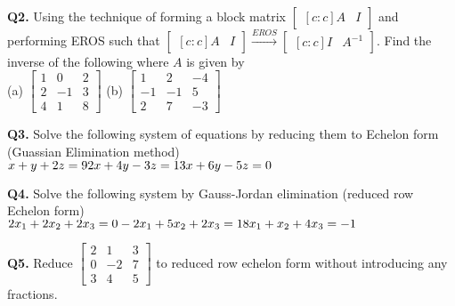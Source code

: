\documentclass[addpoints]{exam}
\begin{document}
\begin{sloppypar}
\begin{questions}
\begin{solution}
    \end{solution}

    \question
    \textbf{Q2. } Using the technique of forming a block matrix $\begin{bmatrix}[c:c]
        A & I
    \end{bmatrix}$ and performing EROS such that $ \begin{bmatrix}[c:c]
        A & I
    \end{bmatrix} \xrightarrow{EROS} \begin{bmatrix}[c:c]
        I & A^{-1}
    \end{bmatrix}$. Find the inverse of the following where $A$ is given by \\ (a) $ \begin{bmatrix}
        1 & 0 & 2 \\ 2 & -1 & 3 \\ 4 & 1 & 8
    \end{bmatrix} $ (b) $ \begin{bmatrix}
        1 & 2 & -4 \\ -1 & -1 & 5 \\ 2 & 7 & -3
    \end{bmatrix} $
    \begin{solution}
        
    \end{solution}

    \question
    \textbf{Q3. } Solve the following system of equations by reducing them to Echelon form (Guassian Elimination method) \\ 
    $ x + y + 2z = 9 \\ 2x + 4y - 3z = 1 \\ 3x + 6y -5z = 0 $
    \begin{solution}
        
    \end{solution}

    \question
    \textbf{Q4. } Solve the following system by Gauss-Jordan elimination (reduced row Echelon form) \\ 
    $ 2x_1 + 2x_2 + 2x_3 = 0 \\ -2x_1 + 5x_2 + 2x_3 = 1 \\ 8x_1 + x_2 + 4x_3 = -1 $
    \begin{solution}
        
    \end{solution}

    \question
    \textbf{Q5. } Reduce $ \begin{bmatrix}
        2 & 1 & 3 \\ 0 & -2 & 7 \\ 3 & 4 & 5
    \end{bmatrix} $ to reduced row echelon form without introducing any fractions.
    \begin{solution}
        

\end{solution}
\end{questions}
\end{sloppypar}
\end{document}
